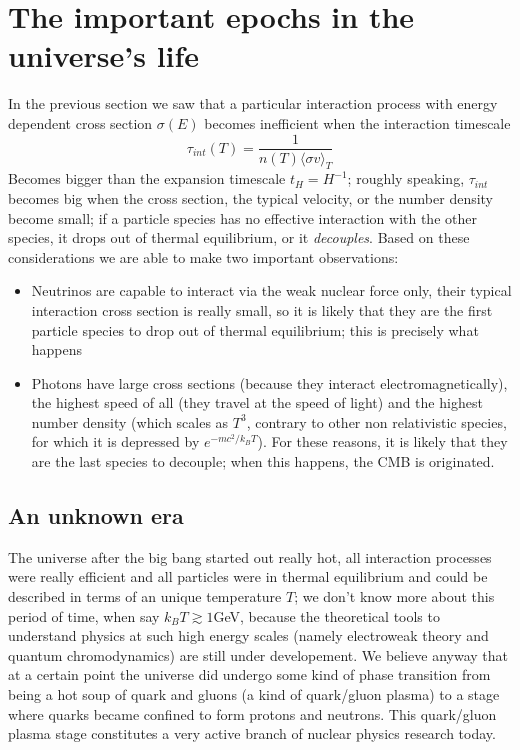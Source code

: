 \section{The important epochs in the universe's life}
In the previous section we saw that a particular interaction process with energy dependent cross section $\sigma(E)$ becomes inefficient when the interaction timescale
\begin{equation}
\tau_{int}(T)=\frac{1}{n(T)\langle\sigma v\rangle_T}
\end{equation}
Becomes bigger than the expansion timescale $t_H=H^{-1}$; roughly speaking, $\tau_{int}$ becomes big when the cross section, the typical velocity, or the number density become small; if a particle species has no effective interaction with the other species, it drops out of thermal equilibrium, or it \textit{decouples}. Based on these considerations we are able to make two important observations:
\begin{itemize}
\item Neutrinos are capable to interact via the weak nuclear force only, their typical interaction cross section is really small, so it is likely that they are the first particle species to drop out of thermal equilibrium; this is precisely what happens
\item Photons have large cross sections (because they interact electromagnetically), the highest speed of all (they travel at the speed of light) and the highest number density (which scales as $T^3$, contrary to other non relativistic species, for which it is depressed by $e^{-mc^2/k_BT}$). For these reasons, it is likely that they are the last species to decouple; when this happens, the CMB is originated. 
\end{itemize}
\subsection{An unknown era}
The universe after the big bang started out really hot, all interaction processes were really efficient and all particles were in thermal equilibrium and could be described in terms of an unique temperature $T$; we don't know more about this period of time, when say $k_BT\gtrsim 1$GeV, because the theoretical tools to understand physics at such high energy scales (namely electroweak theory and quantum chromodynamics) are still under developement. We believe anyway that at a certain point the universe did undergo some kind of phase transition from being a hot soup of quark and gluons (a kind of quark/gluon plasma) to a stage where quarks became confined to form protons and neutrons. This quark/gluon plasma stage constitutes a very active branch of nuclear physics research today. 
